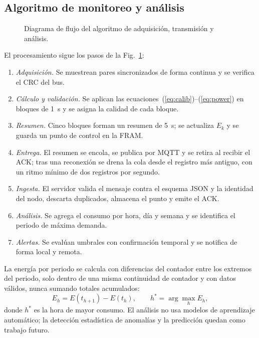 \subsection{Algoritmo de monitoreo y análisis}
\label{sec:algorithm}
\begin{figure}[t]
  \centering
  \caption{Diagrama de flujo del algoritmo de adquisición, transmisión y análisis.}
  \label{fig:algorithm}
\end{figure}

El procesamiento sigue los pasos de la Fig.~\ref{fig:algorithm}:
\begin{enumerate}
  \item \emph{Adquisición.} Se muestrean pares sincronizados de forma continua y se verifica el CRC del bus.
  \item \emph{Cálculo y validación.} Se aplican las ecuaciones~(\ref{eq:calib})--(\ref{eq:power}) en bloques de \SI{1}{s} y se asigna la calidad de cada bloque.
  \item \emph{Resumen.} Cinco bloques forman un resumen de \SI{5}{s}; se actualiza $E_k$ y se guarda un punto de control en la FRAM.
  \item \emph{Entrega.} El resumen se encola, se publica por MQTT y se retira al recibir el ACK; tras una reconexión se drena la cola desde el registro más antiguo, con un ritmo mínimo de dos registros por segundo.
  \item \emph{Ingesta.} El servidor valida el mensaje contra el esquema JSON y la identidad del nodo, descarta duplicados, almacena el punto y emite el ACK.
  \item \emph{Análisis.} Se agrega el consumo por hora, día y semana y se identifica el periodo de máxima demanda.
  \item \emph{Alertas.} Se evalúan umbrales con confirmación temporal y se notifica de forma local y remota.
\end{enumerate}

La energía por periodo se calcula con diferencias del contador entre los extremos del periodo, solo dentro de una misma continuidad de contador y con datos válidos, nunca sumando totales acumulados:
\begin{equation}
E_{h}=E(t_{h+1})-E(t_{h}),\qquad h^{*}=\arg\max_{h}E_{h},
\label{eq:hourly}
\end{equation}
donde $h^{*}$ es la hora de mayor consumo.
El análisis no usa modelos de aprendizaje automático; la detección estadística de anomalías y la predicción quedan como trabajo futuro.

